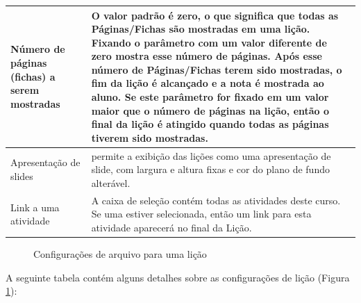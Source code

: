 \begin{longtable}{p{4cm}|p{11cm}}
  {Número de páginas (fichas) a serem mostradas} & O valor padrão é zero, o que significa que todas as Páginas/Fichas são mostradas em uma lição. Fixando o parâmetro com um valor diferente de zero mostra esse número de páginas. Após esse número de Páginas/Fichas terem sido mostradas, o fim da lição é alcançado e a nota é mostrada ao aluno. Se este parâmetro for fixado em um valor maior que o número de páginas na lição, então o final da lição é atingido quando todas as páginas tiverem sido mostradas.\\\hline
  {Apresentação de slides} & permite a exibição das lições como uma apresentação de slide, com largura e altura fixas e cor do plano de fundo alterável.\\\hline
  {Link a uma atividade} & A caixa de seleção contém todas as atividades deste curso. Se uma estiver selecionada, então um link para esta atividade aparecerá no final da Lição.\\\hline
\end{longtable}

\begin{figure}
 \begin{center}
  \caption{Configurações de arquivo para uma lição}
  \label{fig:conf_arq_licao}
 \end{center}
\end{figure}


A seguinte tabela contém alguns detalhes sobre as configurações de lição (Figura \ref{fig:conf_arq_licao}):

